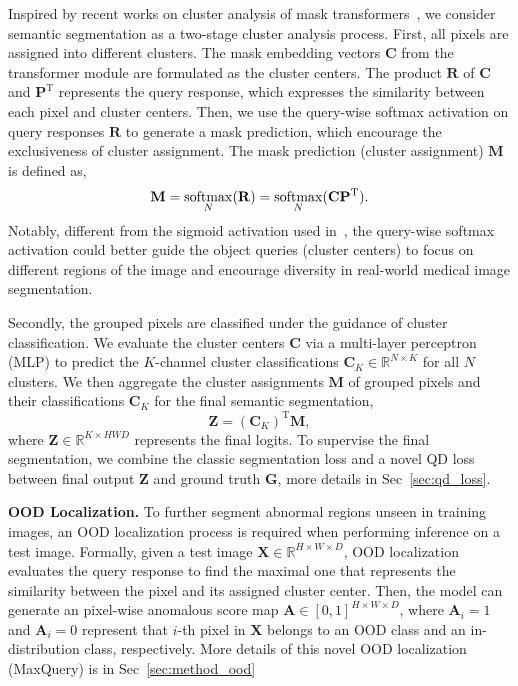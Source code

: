 \documentclass[10pt,twocolumn,letterpaper]{article}
\begin{document}
Inspired by recent works on cluster analysis of mask transformers~\cite{yu2022cmt,yu2022k}, we consider semantic segmentation as a two-stage cluster analysis process. First, all pixels are assigned into different clusters. The mask embedding vectors $\mathbf{C}$ from the transformer module are formulated as the cluster centers. The product $\mathbf{R}$ of $\mathbf{C}$ and $\mathbf{P}^{\mathrm{T}}$ represents the query response, which expresses the similarity between each pixel and cluster centers. Then, we use the query-wise softmax activation on query responses $\mathbf{R}$ to generate a mask prediction, which encourage the exclusiveness of cluster assignment. The mask prediction (cluster assignment) $\mathbf{M}$ is defined as,
\begin{equation}
\label{eq:query-response}
    \mathbf{M} = \operatornamewithlimits{softmax}_{N}(\mathbf{R}) =\operatornamewithlimits{softmax}_{N}(\mathbf{C} \mathbf{P}^{\mathrm{T}}).
\end{equation} 
Notably, different from the sigmoid activation used in~\cite{cheng2021per,cheng2022masked}, the query-wise softmax activation could better guide the object queries (cluster centers) to focus on different regions of the image and encourage diversity in real-world medical image segmentation.

Secondly, the grouped pixels are classified under the guidance of cluster classification. We evaluate the cluster centers $\mathbf{C}$ via a multi-layer perceptron (MLP) to predict the $K$-channel cluster classifications $\mathbf{C}_{K} \in \mathbb{R}^{N \times K}$ for all $N$ clusters. We then aggregate the cluster assignments $\mathbf{M}$ of grouped pixels and their classifications $\mathbf{C}_{K}$ for the final semantic segmentation,
\begin{equation}
\label{eq:final_seg}
    \mathbf{Z} = (\mathbf{C}_{K})^{\mathrm{T}} \mathbf{M},
\end{equation}
where $\mathbf{Z} \in \mathbb{R}^{K \times HWD}$ represents the final logits. To supervise the final segmentation, we combine the classic segmentation loss and a novel QD loss between final output $\mathbf{Z}$ and ground truth $\mathbf{G}$, more details in Sec~\ref{sec:qd_loss}.

{\bf OOD Localization.} To further segment abnormal regions unseen in training images, an OOD localization process is required when performing inference on a test image. Formally, given a test image $\mathbf{X} \in \mathbb{R}^{H \times W \times D}$, OOD localization evaluates the query response to find the maximal one that represents the similarity between the pixel and its assigned cluster center. Then, the model can generate an pixel-wise anomalous score map $\mathbf{A} \in [0, 1]^{H \times W \times D}$, where $\mathbf{A}_{i} = 1$ and $\mathbf{A}_{i} = 0$ represent that $i$-th pixel in $\mathbf{X}$ belongs to an OOD class and an in-distribution class, respectively. More details of this novel OOD localization (MaxQuery) is in Sec~\ref{sec:method_ood}
\end{document}
